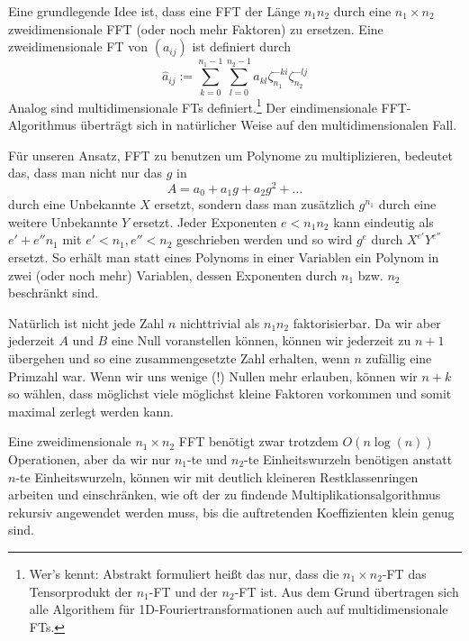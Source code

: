 \begin{remark}
    Eine grundlegende Idee ist, dass eine FFT der Länge $n_1 n_2$ durch eine $n_1\times n_2$ zweidimensionale FFT (oder noch mehr Faktoren) zu ersetzen. Eine zweidimensionale FT von $(a_{ij})$ ist definiert durch
    \[\hat{a}_{ij} := \sum_{k=0}^{n_1-1} \sum_{l=0}^{n_2-1} a_{kl} \zeta_{n_1}^{-ki} \zeta_{n_2}^{-lj}\]
    Analog sind multidimensionale FTs definiert.\footnote{Wer's kennt: Abstrakt formuliert heißt das nur, dass die $n_1\times n_2$-FT das Tensorprodukt der $n_1$-FT und der $n_2$-FT ist. Aus dem Grund übertragen sich alle Algorithem für 1D-Fouriertransformationen auch auf multidimensionale FTs.} Der eindimensionale FFT-Algorithmus überträgt sich in natürlicher Weise auf den multidimensionalen Fall.

    \medskip
    Für unseren Ansatz, FFT zu benutzen um Polynome zu multiplizieren, bedeutet das, dass man nicht nur das $g$ in
    \[A = a_0 + a_1 g + a_2 g^2 + \ldots\]
    durch eine Unbekannte $X$ ersetzt, sondern dass man zusätzlich $g^{n_1}$ durch eine weitere Unbekannte $Y$ ersetzt. Jeder Exponenten $e<n_1 n_2$ kann eindeutig als $e'+e'' n_1$ mit $e'<n_1, e''<n_2$ geschrieben werden und so wird $g^e$ durch $X^{e'} Y^{e''}$ ersetzt. So erhält man statt eines Polynoms in einer Variablen ein Polynom in zwei (oder noch mehr) Variablen, dessen Exponenten durch $n_1$ bzw. $n_2$ beschränkt sind.

    \medskip
    Natürlich ist nicht jede Zahl $n$ nichttrivial als $n_1 n_2$ faktorisierbar. Da wir aber jederzeit $A$ und $B$ eine Null voranstellen können, können wir jederzeit zu $n+1$ übergehen und so eine zusammengesetzte Zahl erhalten, wenn $n$ zufällig eine Primzahl war. Wenn wir uns wenige (!) Nullen mehr erlauben, können wir $n+k$ so wählen, dass möglichst viele möglichst kleine Faktoren vorkommen und somit maximal zerlegt werden kann.

    \medskip
    Eine zweidimensionale $n_1\times n_2$ FFT benötigt zwar trotzdem $O(n\log(n))$ Operationen, aber da wir nur $n_1$-te und $n_2$-te Einheitswurzeln benötigen anstatt $n$-te Einheitswurzeln, können wir mit deutlich kleineren Restklassenringen arbeiten und einschränken, wie oft der zu findende Multiplikationsalgorithmus rekursiv angewendet werden muss, bis die auftretenden Koeffizienten klein genug sind.
\end{remark}

